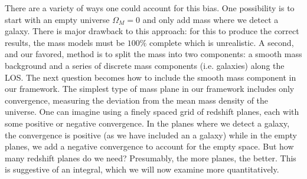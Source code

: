 There are a variety of ways one could account for this bias. One possibility is to start with an empty universe $\Omega_M = 0$ and only add mass where we detect a galaxy. There is major drawback to this approach: for this to produce the correct results, the mass models must be $100\%$ complete which is unrealistic. A second, and our favored, method is to split the mass into two components: a smooth mass background and a series of discrete mass components (i.e. galaxies) along the LOS. The next question becomes how to include the smooth mass component in our framework. The simplest type of mass plane in our framework includes only convergence, measuring the deviation from the mean mass density of the universe. One can imagine using a finely spaced grid of redshift planes, each with some positive or negative convergence. In the planes where we detect a galaxy, the convergence is positive (as we have included an a galaxy) while in the empty planes, we add a negative convergence to account for the empty space. But how many redshift planes do we need? Presumably, the more planes, the better. This is suggestive of an integral, which we will now examine more quantitatively.